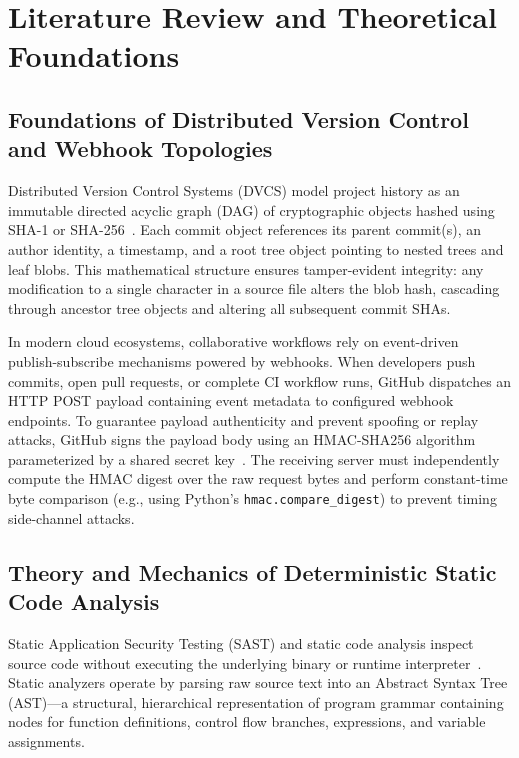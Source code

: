 \chapter{Literature Review and Theoretical Foundations}
\label{chap:literature-review}

\section{Foundations of Distributed Version Control and Webhook Topologies}
\label{sec:lit-dvcs}

Distributed Version Control Systems (DVCS) model project history as an immutable directed acyclic graph (DAG) of cryptographic objects hashed using SHA-1 or SHA-256~\cite{chacon2014pro}. Each commit object references its parent commit(s), an author identity, a timestamp, and a root tree object pointing to nested trees and leaf blobs. This mathematical structure ensures tamper-evident integrity: any modification to a single character in a source file alters the blob hash, cascading through ancestor tree objects and altering all subsequent commit SHAs.

In modern cloud ecosystems, collaborative workflows rely on event-driven publish-subscribe mechanisms powered by webhooks. When developers push commits, open pull requests, or complete CI workflow runs, GitHub dispatches an HTTP POST payload containing event metadata to configured webhook endpoints. To guarantee payload authenticity and prevent spoofing or replay attacks, GitHub signs the payload body using an HMAC-SHA256 algorithm parameterized by a shared secret key~\cite{rfc2104hmac}. The receiving server must independently compute the HMAC digest over the raw request bytes and perform constant-time byte comparison (e.g., using Python's \texttt{hmac.compare\_digest}) to prevent timing side-channel attacks.

\section{Theory and Mechanics of Deterministic Static Code Analysis}
\label{sec:lit-static-analysis}

Static Application Security Testing (SAST) and static code analysis inspect source code without executing the underlying binary or runtime interpreter~\cite{chess2004static}. Static analyzers operate by parsing raw source text into an Abstract Syntax Tree (AST)---a structural, hierarchical representation of program grammar containing nodes for function definitions, control flow branches, expressions, and variable assignments.

